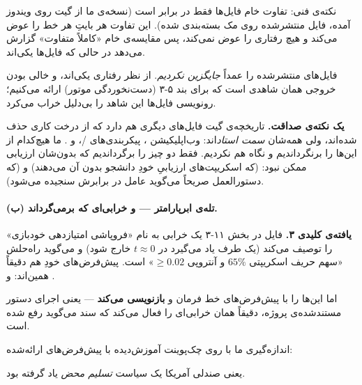 \documentclass[12pt,a4paper]{article}
\begin{document}
نکته‌ی فنی: تفاوت خام فایل‌ها فقط  در برابر  است (نسخه‌ی
ما از  گیت روی ویندوز آمده، فایل منتشرشده روی مک بسته‌بندی
شده). این تفاوت هر بایتِ هر خط را عوض می‌کند و هیچ رفتاری را عوض نمی‌کند،
پس مقایسه‌ی خام «کاملاً متفاوت» گزارش می‌دهد در حالی که فایل‌ها یکی‌اند.

فایل‌های منتشرشده را عمداً \emph{جایگزین نکردیم}. از نظر رفتاری یکی‌اند، و
خالی بودن خروجی  همان شاهدی است که برای
بند ۵-۳ (دست‌نخوردگی موتور) ارائه می‌کنیم؛ رونویسی فایل‌ها این شاهد را
بی‌دلیل خراب می‌کرد.

\begin{answer}
\textbf{یک نکته‌ی صداقت.} تاریخچه‌ی گیت فایل‌های دیگری هم دارد که از درخت
کاری حذف شده‌اند، ولی همه‌شان \emph{سمت استاد}اند: وب‌اپلیکیشن
، پیکربندی‌های /، و
. ما هیچ‌کدام از این‌ها را برنگرداندیم و نگاه هم
نکردیم. فقط دو چیز را برگرداندیم که بدون‌شان ارزیابی ممکن نبود:
 (که اسکریپت‌های ارزیابیِ خودِ دانشجو بدون آن
 می‌دهند) و  (که
دستورالعمل صریحاً می‌گوید عامل در برابرش سنجیده می‌شود).
\end{answer}

\paragraph{(ب) تله‌ی ابرپارامتر — و خرابی‌ای که برمی‌گرداند.}

\begin{findbox}
\textbf{یافته‌ی کلیدی ۳.}
فایل  در بخش ۱۱-۳ یک خرابی به نام
«فروپاشی امتیازدهی خودبازی» را توصیف می‌کند (یک طرف یاد می‌گیرد در
$t\approx0$ خارج شود) و می‌گوید راه‌حلش «سهم حریف اسکریپتی $65\%$ و
آنتروپی $\ge0.02$» است. پیش‌فرض‌های خودِ  هم دقیقاً همین‌اند:
 و .

اما  این‌ها را با پیش‌فرض‌های خط فرمان
 و  \textbf{بازنویسی می‌کند} — یعنی
اجرای دستور مستندشده‌ی پروژه، دقیقاً همان خرابی‌ای را فعال می‌کند که سند
می‌گوید رفع شده است.

اندازه‌گیری ما با  روی چک‌پوینت آموزش‌دیده با
پیش‌فرض‌های ارائه‌شده:
\begin{center}
\end{center}
یعنی صندلی آمریکا یک سیاست \emph{تسلیم محض} یاد گرفته بود.
\end{findbox}
\end{document}
